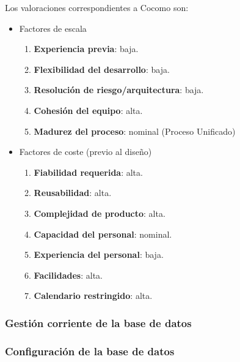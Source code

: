 \documentclass[11pt, a4paper, twoside, titlepage]{article}
\begin{document}
				Los valoraciones correspondientes a Cocomo son:
				
				\begin{itemize}

				\item Factores de escala

				\begin{enumerate}
					\item \textbf{Experiencia previa}: baja.
					\item \textbf{Flexibilidad del desarrollo}: baja.
					\item \textbf{Resolución de riesgo/arquitectura}: baja.
					\item \textbf{Cohesión del equipo}: alta.
					\item \textbf{Madurez del proceso}: nominal (Proceso Unificado)
				\end{enumerate}

				\item Factores de coste (previo al diseño)

				\begin{enumerate}
					\item \textbf{Fiabilidad requerida}: alta.
					\item \textbf{Reusabilidad}: alta.
					\item \textbf{Complejidad de producto}: alta.
					\item \textbf{Capacidad del personal}: nominal.
					\item \textbf{Experiencia del personal}: baja.
					\item \textbf{Facilidades}: alta.
					\item \textbf{Calendario restringido}: alta.
				\end{enumerate}

				\end{itemize}


			\subsubsection{Gestión corriente de la base de datos} \label{estimac:gestioncorriente}
				
			
			\subsubsection{Configuración de la base de datos} \label{estimac:configuracion}
					
\end{document}
